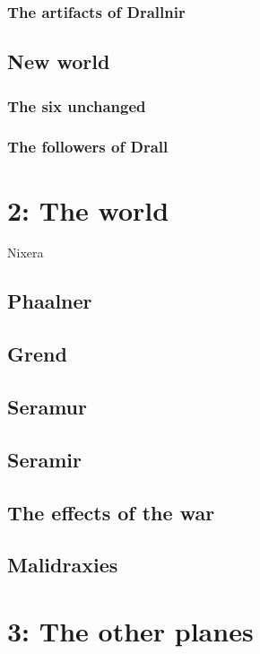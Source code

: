 \documentclass[a4paper]{book}
\begin{document}
\subsubsection{The artifacts of Drallnir}

\subsection{New world}

\subsubsection{The six unchanged}

\subsubsection{The followers of Drall}

\section{2: The world}
Nixera
\subsection{Phaalner}

\subsection{Grend}

\subsection{Seramur}

\subsection{Seramir}

\subsection{The effects of the war}

\subsection{Malidraxies}

\section{3: The other planes}
\end{document}
